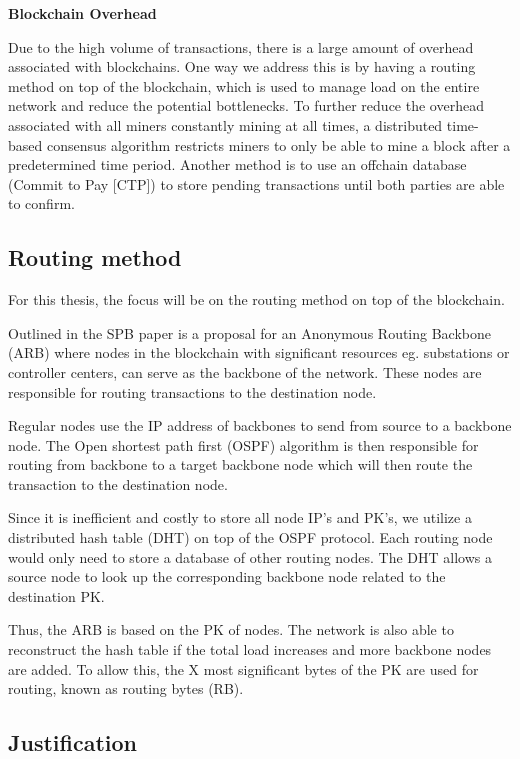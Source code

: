 \textbf{Blockchain Overhead}

Due to the high volume of transactions, there is a large amount of overhead associated with blockchains. One way we address this is by having a routing method on top of the blockchain, which is used to manage load on the entire network and reduce the potential bottlenecks. To further reduce the overhead associated with all miners constantly mining at all times, a distributed time-based consensus algorithm restricts miners to only be able to mine a block after a predetermined time period. Another method is to use an offchain database (Commit to Pay [CTP]) to store pending transactions until both parties are able to confirm.

\subsection{Routing method}

For this thesis, the focus will be on the routing method on top of the blockchain. 

Outlined in the SPB paper is a proposal for an Anonymous Routing Backbone (ARB) where nodes in the blockchain with significant resources eg. substations or controller centers, can serve as the backbone of the network. These nodes are responsible for routing transactions to the destination node. \cite{spb}

Regular nodes use the IP address of backbones to send from source to a backbone node. The Open shortest path first (OSPF) algorithm is then responsible for routing from backbone to a target backbone node which will then route the transaction to the destination node. 

Since it is inefficient and costly to store all node IP's and PK's, we utilize a distributed hash table (DHT) on top of the OSPF protocol. Each routing node would only need to store a database of other routing nodes. The DHT allows a source node to look up the corresponding backbone node related to the destination PK. 

Thus, the ARB is based on the PK of nodes. The network is also able to reconstruct the hash table if the total load increases and more backbone nodes are added. To allow this, the X most significant bytes of the PK are used for routing, known as routing bytes (RB). \cite{spb}

\subsection{Justification}

